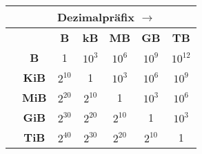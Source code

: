 \documentclass{standalone}
\begin{document}
\begin{tabular}{|c|c|c|c|c|c|c|}
	\hline\rule{0pt}{3ex}
	\space                                                                       & \multicolumn{6}{c|}{Dezimalpräfix $\longrightarrow$}                                                                      \\
	\hline\rule{0pt}{3ex}
	\multirow{6}{*}{\rotatebox[origin=center]{90}{$\longleftarrow$ Binärpräfix}} & \space                                               & \textbf{B} & \textbf{kB} & \textbf{MB} & \textbf{GB} & \textbf{TB} \\
	\cline{2-7}\rule{0pt}{3ex}                                                   & \textbf{B}                                           & 1          & $10^{3}$    & $10^{6}$    & $10^{9}$    & $10^{12}$   \\
	\cline{2-7}\rule{0pt}{3ex}                                                   & \textbf{KiB}                                         & $2^{10}$   & 1           & $10^{3}$    & $10^{6}$    & $10^{9}$    \\
	\cline{2-7}\rule{0pt}{3ex}                                                   & \textbf{MiB}                                         & $2^{20}$   & $2^{10}$    & 1           & $10^{3}$    & $10^{6}$    \\
	\cline{2-7}\rule{0pt}{3ex}                                                   & \textbf{GiB}                                         & $2^{30}$   & $2^{20}$    & $2^{10}$    & 1           & $10^{3}$    \\
	\cline{2-7}\rule{0pt}{3ex}                                                   & \textbf{TiB}                                         & $2^{40}$   & $2^{30}$    & $2^{20}$    & $2^{10}$    & 1           \\
	\hline
\end{tabular}
\end{document}
